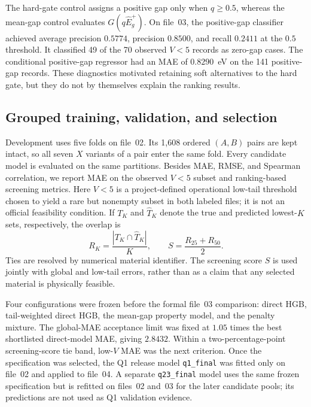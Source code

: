The hard-gate control assigns a positive gap only when $q\geq0.5$,
whereas the mean-gap control evaluates $G(q\widehat E_g^{+})$.  On file~03,
the positive-gap classifier achieved average precision $0.5774$, precision
$0.8500$, and recall $0.2411$ at the $0.5$ threshold.  It classified 49 of
the 70 observed $V<5$ records as zero-gap cases.  The conditional
positive-gap regressor had an MAE of $0.8290$~eV on the 141 positive-gap
records.  These diagnostics motivated retaining soft alternatives to the
hard gate, but they do not by themselves explain the ranking results.

\subsection{Grouped training, validation, and selection}

Development uses five folds on file~02.  Its 1,608 ordered $(A,B)$ pairs are
kept intact, so all seven $X$ variants of a pair enter the same fold.  Every
candidate model is evaluated on the same partitions.  Besides MAE, RMSE,
and Spearman correlation, we report MAE on the observed $V<5$ subset and
ranking-based screening metrics.  Here $V<5$ is a project-defined operational
low-tail threshold chosen to yield a rare but nonempty subset in both labeled
files; it is not an official feasibility condition.  If $T_K$ and
$\widehat T_K$ denote the
true and predicted lowest-$K$ sets, respectively, the overlap is
\begin{equation}
  R_K=\frac{|T_K\cap\widehat T_K|}{K},\qquad
  S=\frac{R_{25}+R_{50}}{2}.
  \label{eq:q1-screening-score}
\end{equation}
Ties are resolved by numerical material identifier.  The screening score
$S$ is used jointly with global and low-tail errors, rather than as a claim
that any selected material is physically feasible.

Four configurations were frozen before the formal file~03 comparison:
direct HGB, tail-weighted direct HGB, the mean-gap property model, and the
penalty mixture.  The global-MAE acceptance limit was fixed at $1.05$ times
the best shortlisted direct-model MAE, giving $2.8432$.  Within a
two-percentage-point screening-score tie band, low-$V$ MAE was the next
criterion.  Once the specification was selected, the Q1 release model
\texttt{q1\_final} was fitted only on file~02 and applied to file~04.  A
separate \texttt{q23\_final} model uses the same frozen specification but is
refitted on files~02 and~03 for the later candidate pools; its predictions
are not used as Q1 validation evidence.

